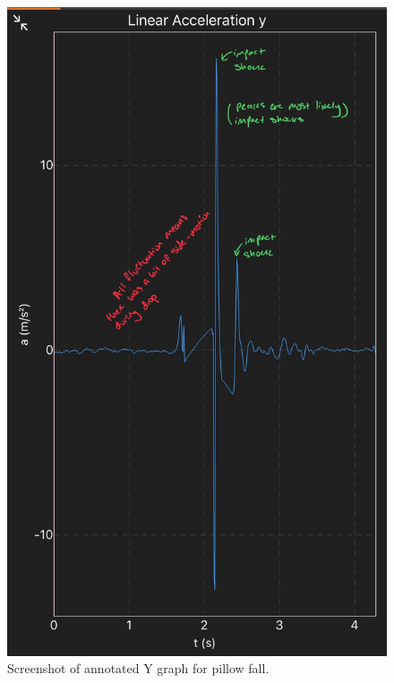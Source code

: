 \documentclass[idxtotoc,hyperref,openany]{labbook} %
\begin{document}
\begin{figure}[H] %
\begin{center}
\includegraphics[width=.80\linewidth]{images/Lab.04/Lab04Y.jpg}
\end{center}
\caption{Screenshot of annotated Y graph for pillow fall.}
\label{fig:Lab04-AnnotatedYGraph}
\end{figure}
\end{document}
